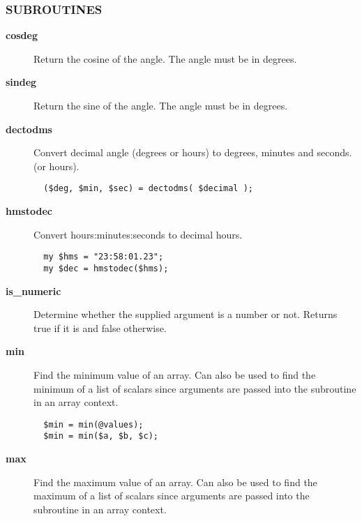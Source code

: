 \subsubsection*{SUBROUTINES\label{ORAC::General_SUBROUTINES}}
\begin{description}

\item[\textbf{cosdeg}] \mbox{}

Return the cosine of the angle. The angle must be in degrees.


\item[\textbf{sindeg}] \mbox{}

Return the sine of the angle. The angle must be in degrees.


\item[\textbf{dectodms}] \mbox{}

Convert decimal angle (degrees or hours) to degrees, minutes and seconds.
(or hours).

\begin{verbatim}
  ($deg, $min, $sec) = dectodms( $decimal );
\end{verbatim}

\item[\textbf{hmstodec}] \mbox{}

Convert hours:minutes:seconds to decimal hours.

\begin{verbatim}
  my $hms = "23:58:01.23";
  my $dec = hmstodec($hms);
\end{verbatim}

\item[\textbf{is\_numeric}] \mbox{}

Determine whether the supplied argument is a number or not.
Returns true if it is and false otherwise.


\item[\textbf{min}] \mbox{}

Find the minimum value of an array. Can also be used to find
the minimum of a list of scalars since arguments are passed into
the subroutine in an array context.

\begin{verbatim}
  $min = min(@values);
  $min = min($a, $b, $c);
\end{verbatim}

\item[\textbf{max}] \mbox{}

Find the maximum value of an array. Can also be used to find
the maximum of a list of scalars since arguments are passed into
the subroutine in an array context.


\end{description}
